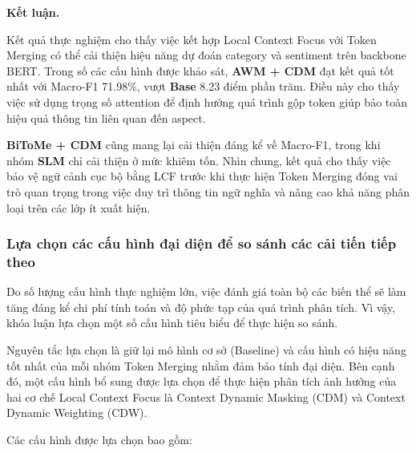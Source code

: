 \textbf{Kết luận.}

Kết quả thực nghiệm cho thấy việc kết hợp Local Context Focus với Token Merging có thể cải thiện hiệu năng dự đoán category và sentiment trên backbone BERT. Trong số các cấu hình được khảo sát, \textbf{AWM + CDM} đạt kết quả tốt nhất với Macro-F1 71.98\%, vượt \textbf{Base} 8.23 điểm phần trăm. Điều này cho thấy việc sử dụng trọng số attention để định hướng quá trình gộp token giúp bảo toàn hiệu quả thông tin liên quan đến aspect.

\textbf{BiToMe + CDM} cũng mang lại cải thiện đáng kể về Macro-F1, trong khi nhóm \textbf{SLM} chỉ cải thiện ở mức khiêm tốn. Nhìn chung, kết quả cho thấy việc bảo vệ ngữ cảnh cục bộ bằng LCF trước khi thực hiện Token Merging đóng vai trò quan trọng trong việc duy trì thông tin ngữ nghĩa và nâng cao khả năng phân loại trên các lớp ít xuất hiện.

\subsubsection*{Lựa chọn các cấu hình đại diện để so sánh các cải tiến tiếp theo }
Do số lượng cấu hình thực nghiệm lớn, việc đánh giá toàn bộ các biến thể sẽ làm tăng đáng kể chi phí tính toán và độ phức tạp của quá trình phân tích. Vì vậy, khóa luận lựa chọn một số cấu hình tiêu biểu để thực hiện so sánh.

Nguyên tắc lựa chọn là giữ lại mô hình cơ sở (Baseline) và cấu hình có hiệu năng tốt nhất của mỗi nhóm Token Merging nhằm đảm bảo tính đại diện. Bên cạnh đó, một cấu hình bổ sung được lựa chọn để thực hiện phân tích ảnh hưởng của hai cơ chế Local Context Focus là Context Dynamic Masking (CDM) và Context Dynamic Weighting (CDW).

Các cấu hình được lựa chọn bao gồm:

